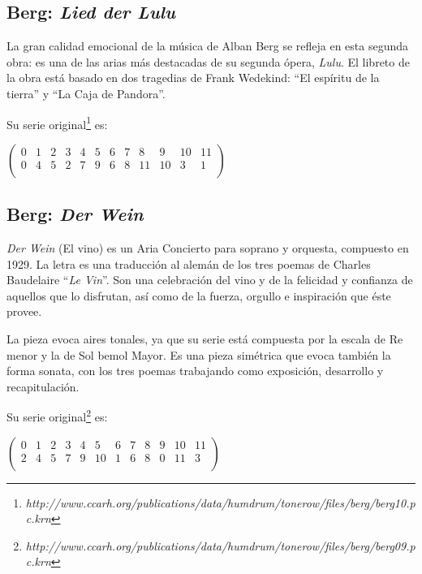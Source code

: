         
        \subsection*{Berg: \textit{Lied der Lulu}}
        La gran calidad emocional de la música de Alban Berg se refleja en esta segunda obra: es una de las arias más destacadas de su segunda ópera, \textit{Lulu}. El libreto de la obra está basado en dos tragedias de Frank Wedekind: ``El espíritu de la tierra'' y ``La Caja de Pandora''. 
                
        Su serie original\footnote{\textit{http://www.ccarh.org/publications/data/humdrum/tonerow/files/berg/berg10.pc.krn}} es:
        \begin{footnotesize}
        	$\left(\begin{matrix}0&1&2&3&4&5&6&7&8&9&10&11\\0&4&5&2&7&9&6&8&11&10&3&1\\\end{matrix}\right)$	
        \end{footnotesize}        
        
        
        \subsection*{Berg: \textit{Der Wein}}
        
        \textit{Der Wein} (El vino) es un Aria Concierto para soprano y orquesta, compuesto en 1929. La letra es una traducción al alemán de los tres poemas de Charles Baudelaire ``\textit{Le Vin}''. Son una celebración del vino y de la felicidad y confianza de aquellos que lo disfrutan, así como de la fuerza, orgullo e inspiración que éste provee.
        
        La pieza evoca aires tonales, ya que su serie está compuesta por la escala de Re menor y la de Sol bemol Mayor. Es una pieza simétrica que evoca también la forma sonata, con los tres poemas trabajando como exposición, desarrollo y recapitulación.
        
        Su serie original\footnote{\textit{http://www.ccarh.org/publications/data/humdrum/tonerow/files/berg/berg09.pc.krn}} es: 
        \begin{footnotesize}
        	$\left(\begin{matrix}0&1&2&3&4&5&6&7&8&9&10&11\\2&4&5&7&9&10&1&6&8&0&11&3\\\end{matrix}\right)$	
        \end{footnotesize}
        
